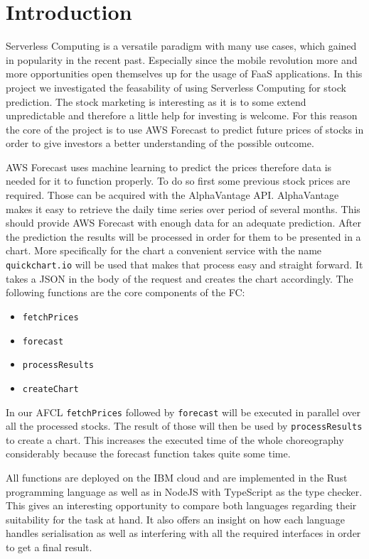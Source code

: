 %
%
%
\chapter{\label{chap:introduction}Introduction}

Serverless Computing is a versatile paradigm with many use cases, which gained
in popularity in the recent past.  Especially since the mobile revolution more
and more opportunities open themselves up for the usage of FaaS applications.  In
this project we investigated the feasability of using Serverless Computing for
stock prediction. The stock marketing is interesting as it is to some extend
unpredictable and therefore a little help for investing is welcome. For this
reason the core of the project is to use AWS Forecast to predict future prices
of stocks in order to give investors a better understanding of the possible
outcome.

AWS Forecast uses machine learning to predict the prices therefore data is
needed for it to function properly. To do so first some previous stock prices
are required. Those can be acquired with the AlphaVantage API.
AlphaVantage makes it easy to retrieve the daily time series over period of
several months. This should provide AWS Forecast with enough data for an
adequate prediction. After the prediction the results will be processed in
order for them to be presented in a chart. More specifically for the chart a
convenient service with the name \texttt{quickchart.io} will be used that
makes that process easy and straight forward. It takes a JSON in the
body of the request and creates the chart accordingly. The following functions
are the core components of the FC:

\begin{itemize}
  \item \texttt{fetchPrices}
  \item \texttt{forecast}
  \item \texttt{processResults}
  \item \texttt{createChart}
\end{itemize}

In our AFCL \texttt{fetchPrices} followed by \texttt{forecast} will be executed
in parallel over all the processed stocks. The result of those will then be
used by \texttt{processResults} to create a chart. This increases the executed
time of the whole choreography considerably because the forecast function takes
quite some time.

All functions are deployed on the IBM cloud and are
implemented in the Rust programming language as well as in
NodeJS with TypeScript as the type checker. This gives an
interesting opportunity to compare both languages regarding their suitability
for the task at hand. It also offers an insight on how each language handles
serialisation as well as interfering with all the required interfaces in order
to get a final result.
